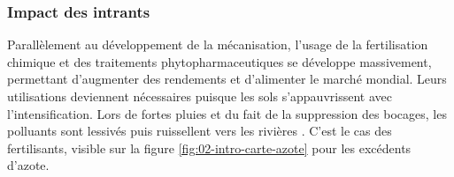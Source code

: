 \documentclass[../thesis.tex]{subfiles}
\begin{document}
    
    \subsubsection{Impact des intrants}
    \label{sec:impact-surprod}
    
    Parallèlement au développement de la mécanisation, l'usage de la fertilisation chimique et des traitements phytopharmaceutiques se développe massivement, permettant d'augmenter des rendements et d'alimenter le marché mondial. Leurs utilisations deviennent nécessaires puisque les sols s'appauvrissent avec l'intensification. Lors de fortes pluies et du fait de la suppression des bocages, les polluants sont lessivés puis ruissellent vers les rivières \cite{tournebize2020, pic2022mais}. C'est le cas des fertilisants, visible sur la figure \ref{fig:02-intro-carte-azote} pour les excédents d'azote.
    
\end{document}
